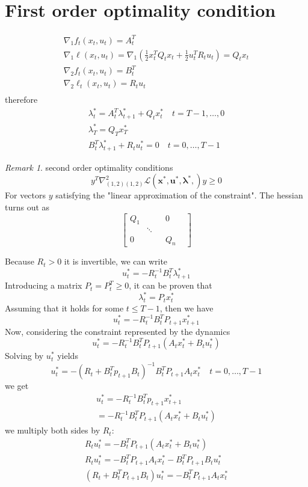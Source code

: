 \documentclass[openany]{book}
\theoremstyle{definition}
\theoremstyle{remark}
\newtheorem*{remark}{Remark}
\begin{document}
\section{First order optimality condition}
\begin{gather*}
    \nabla_1f_t(x_t,u_t) = A_t^T\\
    \nabla_1\ell(x_t,u_t) = \nabla_1(\displaystyle\frac{1}{2}x_t^TQ_tx_t+\displaystyle\frac{1}{2}u_t^TR_tu_t)=Q_tx_t\\
    \nabla_2f_t(x_t,u_t) = B_t^T\\
    \nabla_2\ell_t(x_t,u_t) = R_tu_t\\
\end{gather*}
therefore 
\begin{gather*}
    \lambda_t^* = A_t^T\lambda_{t+1}^* + Q_tx_t^* \quad t= T-1,\dots,0\\
    \lambda_T^* = Q_Tx_T^* \\
    B_t^T\lambda_{t+1}^* + R_tu_t^* = 0 \quad t=0,\dots,T-1
\end{gather*}
\begin{remark}
second order optimality conditions 
\[
    y^T\nabla^2_{(1,2)(1,2)}\mathcal{L}(\mathbf{x}^*,\mathbf{u}^*,\boldsymbol{\lambda}^*,)y \geq 0
\]
For vectors $y$ satisfying the "linear approximation of the constraint". The hessian turns out as 
\[
    \begin{bmatrix}
        Q_1 & & &  0\\
            & \ddots & & & \\ 
        0 & & & Q_n
    \end{bmatrix}
\]
\end{remark}
Because $R_t>0$ it is invertible, we can write 
\[
    u_t^* = -R_t^{-1}B_t^T\lambda_{t+1}^*
\]
Introducing a matrix $P_t=P_t^T \geq 0$, it can be proven that 
\[
    \lambda_t^* = P_tx_t^*
\]
Assuming that it holds for some $t\leq T-1$, then we have 
\[
    u_t^* = -R_t^{-1}B_t^TP_{t+1}x_{t+1}^*
\]
Now, considering the constraint represented by the dynamics 
\[
    u_t^* = -R_t^{-1}B_t^TP_{t+1}(A_tx_t^*+B_tu_t^*)
\]
Solving by $u^*_t$ yields 
\[
    u_t^* = -(R_t+B_t^Tp_{t+1}B_t)^{-1}B_t^TP_{t+1}A_tx^*_t \quad t=0,\dots,T-1
\]
we get 
\begin{gather*}
    u_t^* = -R_t^{-1}B_t^Tp_{t+1}x_{t+1}^* \\
    = -R_t^{-1}B_t^TP_{t+1}(A_tx_t^*+B_tu_t^*)
\end{gather*}
we multiply both sides by $R_t$: 
\begin{gather*}
    R_tu_t^* = -B_t^TP_{t+1}(A_tx_t^*+B_tu_t^*)\\
    R_tu_t^* = -B_t^TP_{t+1}A_tx_t^*-B_t^TP_{t+1}B_tu_t^*\\
    (R_t+B_t^TP_{t+1}B_t)u_t^* = -B_t^TP_{t+1}A_tx_t^*
\end{gather*}
\end{document}
